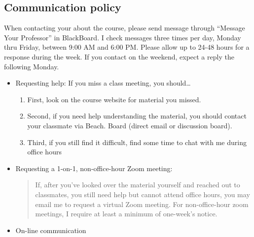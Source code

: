 \documentclass[11pt,]{article}
\providecommand{\tightlist}{%
  \setlength{\itemsep}{0pt}\setlength{\parskip}{0pt}}
\begin{document}
\hypertarget{communication-policy}{%
\subsection{Communication policy}\label{communication-policy}}

When contacting your about the course, please send message through
``Message Your Professor'' in BlackBoard. I check messages three times
per day, Monday thru Friday, between 9:00 AM and 6:00 PM. Please allow
up to 24-48 hours for a response during the week. If you contact on the
weekend, expect a reply the following Monday.

\begin{itemize}
\item
  Requesting help: If you miss a class meeting, you should\ldots{}

  \begin{enumerate}
  \def\labelenumi{\arabic{enumi}.}
  \tightlist
  \item
    First, look on the course website for material you missed.
  \item
    Second, if you need help understanding the material, you should
    contact your classmate via Beach. Board (direct email or discussion
    board).
  \item
    Third, if you still find it difficult, find some time to chat with
    me during office hours
  \end{enumerate}
\item
  Requesting a 1-on-1, non-office-hour Zoom meeting:

  \begin{quote}
  If, after you've looked over the material yourself and reached out to
  classmates, you still need help but cannot attend office hours, you
  may email me to request a virtual Zoom meeting. For non-office-hour
  zoom meetings, I require at least a minimum of one-week's notice.
  \end{quote}
\item
  On-line communication


\end{itemize}
\end{document}

